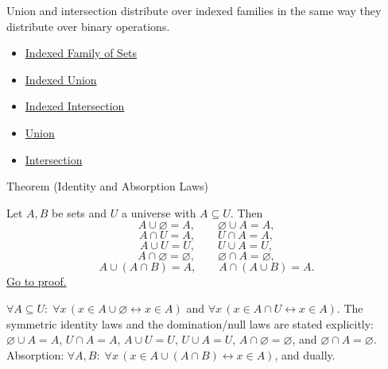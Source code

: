 \begin{remark*}[Interpretation]
Union and intersection distribute over indexed families in the same way they
distribute over binary operations.
\end{remark*}


\begin{dependencies}
\begin{itemize}
  \item \hyperref[def:indexed-family]{Indexed Family of Sets}
  \item \hyperref[def:indexed-union]{Indexed Union}
  \item \hyperref[def:indexed-intersection]{Indexed Intersection}
  \item \hyperref[def:union]{Union}
  \item \hyperref[def:intersection]{Intersection}
\end{itemize}
\end{dependencies}

\begin{theorembox}{Theorem (Identity and Absorption Laws)}
\begin{theorem}\label{thm:identity-absorption}
Let $A,B$ be sets and $U$ a universe with $A \subseteq U$. Then
\[
A \cup \varnothing = A,
\qquad
\varnothing \cup A = A,
\]
\[
A \cap U = A,
\qquad
U \cap A = A,
\]
\[
A\cup U=U,
\qquad
U\cup A=U,
\]
\[
A\cap\varnothing=\varnothing,
\qquad
\varnothing\cap A=\varnothing,
\]
\[
A \cup (A \cap B) = A,
\qquad
A \cap (A \cup B) = A.
\]
\hyperref[prf:identity-absorption]{Go to proof.}
\end{theorem}
\end{theorembox}

\begin{remark*}
$\forall A \subseteq U:\; \forall x\,(x \in A \cup \varnothing \leftrightarrow x \in A)$ and $\forall x\,(x \in A \cap U \leftrightarrow x \in A)$.
The symmetric identity laws and the domination/null laws are stated explicitly:
$\varnothing\cup A=A$, $U\cap A=A$, $A\cup U=U$, $U\cup A=U$,
$A\cap\varnothing=\varnothing$, and $\varnothing\cap A=\varnothing$.
Absorption: $\forall A, B:\; \forall x\,(x \in A \cup (A \cap B) \leftrightarrow x \in A)$, and dually.
\end{remark*}

